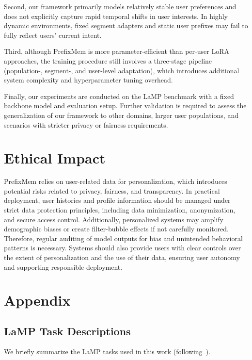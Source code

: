 \documentclass[11pt]{article}
\begin{document}
Second, our framework primarily models relatively stable user preferences and does not explicitly capture rapid temporal shifts in user interests. In highly dynamic environments, fixed segment adapters and static user prefixes may fail to fully reflect users’ current intent.

Third, although PrefixMem is more parameter-efficient than per-user LoRA approaches, the training procedure still involves a three-stage pipeline (population-, segment-, and user-level adaptation), which introduces additional system complexity and hyperparameter tuning overhead.

Finally, our experiments are conducted on the LaMP benchmark with a fixed backbone model and evaluation setup. Further validation is required to assess the generalization of our framework to other domains, larger user populations, and scenarios with stricter privacy or fairness requirements.

\section*{Ethical Impact}
PrefixMem relies on user-related data for personalization, which introduces potential risks related to privacy, fairness, and transparency. In practical deployment, user histories and profile information should be managed under strict data protection principles, including data minimization, anonymization, and secure access control. Additionally, personalized systems may amplify demographic biases or create filter-bubble effects if not carefully monitored. Therefore, regular auditing of model outputs for bias and unintended behavioral patterns is necessary. Systems should also provide users with clear controls over the extent of personalization and the use of their data, ensuring user autonomy and supporting responsible deployment.




\appendix
\section{Appendix}
\subsection{LaMP Task Descriptions}

We briefly summarize the LaMP tasks used in this work (following~\cite{salemi2024lamp}).
\end{document}
